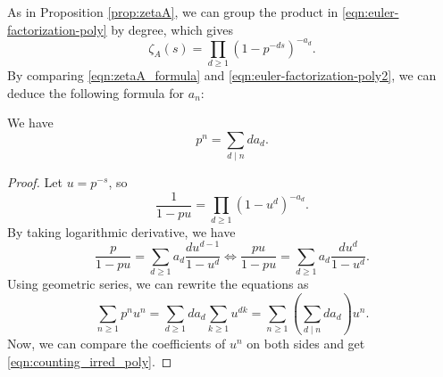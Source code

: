 As in Proposition \ref{prop:zetaA}, we can group the product in \eqref{eqn:euler-factorization-poly} by degree, which gives
\begin{equation}
    \zeta_A(s) = \prod_{d \ge 1} (1 - p^{-ds})^{-a_d}.
    \label{eqn:euler-factorization-poly2}
\end{equation}
By comparing \eqref{eqn:zetaA_formula} and \eqref{eqn:euler-factorization-poly2}, we can deduce the following formula for $a_n$:
\begin{theorem}
    We have
    \begin{equation}
        p^n = \sum_{d \mid n} d a_d.
        \label{eqn:counting_irred_poly}
    \end{equation}
\end{theorem}
\begin{proof}
    Let $u = p^{-s}$, so
    \begin{equation}
        \frac{1}{1 - pu} = \prod_{d \ge 1} (1 - u^d)^{-a_d}.
    \end{equation}
    By taking logarithmic derivative, we have
    \begin{equation}
        \frac{p}{1 - pu} = \sum_{d \ge 1} a_d \frac{d u^{d-1}}{1 - u^d} \Leftrightarrow \frac{pu}{1 - pu} = \sum_{d \ge 1} a_d \frac{d u^d}{1 - u^d}.
    \end{equation}
    Using geometric series, we can rewrite the equations as
    \begin{equation}
        \sum_{n \ge 1} p^n u^n = \sum_{d \ge 1} d a_d \sum_{k \ge 1} u^{dk} = \sum_{n \ge 1} \left(\sum_{d \mid n} d a_d\right) u^n.
    \end{equation}
    Now, we can compare the coefficients of $u^n$ on both sides and get \eqref{eqn:counting_irred_poly}.
\end{proof}


